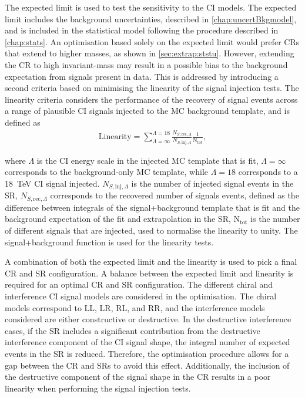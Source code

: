 The expected limit is used to test the sensitivity to the CI models. The expected limit includes the background uncertainties, described in \cref{chap:uncertBkgmodel}, and is included in the statistical model following the procedure described in \cref{chap:stats}. An optimisation based solely on the expected limit would prefer CRs that extend to higher masses, as shown in \cref{sec:extrap:ststu}. However, extending the CR to high invariant-mass may result in a possible bias to the background expectation from signals present in data. This is addressed by introducing a second criteria based on minimising the linearity of the signal injection tests. The linearity criteria considers the performance of the recovery of signal events across a range of plausible CI signals injected to the MC background template, and is defined as
\begin{equation}
    \label{eq:linearity}
    \begin{aligned}
        \mathrm{Linearity} = \sum^{\Lambda = 18}_{\Lambda = \infty} \frac{N_{S,\mathrm{rec},\Lambda}}{N_{S,\mathrm{inj},\Lambda}}  \frac{1}{\mathrm{N}_\mathrm{tot}},
    \end{aligned}
\end{equation}

where $\Lambda$ is the CI energy scale in the injected MC template that is fit, $\Lambda = \infty$ corresponds to the background-only MC template, while $\Lambda = 18$ corresponds to a \SI{18}{\tera\electronvolt} CI signal injected. $N_{S,\mathrm{inj},\Lambda}$ is the number of injected signal events in the SR, $N_{S,\mathrm{rec},\Lambda}$ corresponds to the recovered number of signals events, defined as the difference between integrals of the signal+background template that is fit and the background expectation of the fit and extrapolation in the SR, $\mathrm{N}_\mathrm{tot}$ is the number of different signals that are injected, used to normalise the linearity to unity. The signal+background function is used for the linearity tests. 

A combination of both the expected limit and the linearity is used to pick a final CR and SR configuration. A balance between the expected limit and linearity is required for an optimal CR and SR configuration. The different chiral and interference CI signal models are considered in the optimisation. The chiral models correspond to LL, LR, RL, and RR, and the interference models considered are either constructive or destructive. In the destructive interference cases, if the SR includes a significant contribution from the destructive interference component of the CI signal shape, the integral number of expected events in the SR is reduced. Therefore, the optimisation procedure allows for a gap between the CR and SRs to avoid this effect. Additionally, the inclusion of the destructive component of the signal shape in the CR results in a poor linearity when performing the signal injection tests. 

